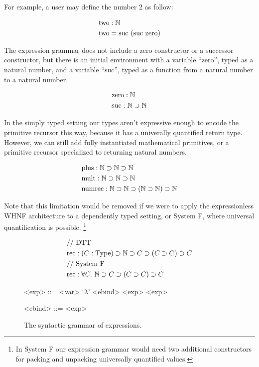 \documentclass[preprint,authoryear]{sigplanconf}
\def\asc{:}
\def\arr{\supset}
\def\nat{\mathbb{N}}
\def\zero{\con{zero}}
\newcommand{\suc}[1]{\con{suc}~#1}
\newcommand{\con}[1]{\textmd{#1}}
\begin{document}
For example, a user may define the number 2 as follow:

\begin{align*}
&\con{two} : \nat\\
&\con{two} = \suc{(\suc{\zero})}
\end{align*}

The expression grammar does not include a zero constructor or a
successor constructor, but there is an initial environment with a
variable ``zero'', typed as a natural number, and a variable ``suc'',
typed as a function from a natural number to a natural number.

\begin{align*}
&\con{zero} : \nat\\
&\con{suc} : \nat \arr \nat
\end{align*}

In the simply typed setting our types aren't expressive enough to
encode the primitive recursor this way, because it has a univerally
quantified return type. However, we can still add fully instantiated
mathematical primitives, or a primitive recursor specialized to
returning natural numbers.

\begin{align*}
&\con{plus} : \nat \arr \nat \arr \nat\\
&\con{mult} : \nat \arr \nat \arr \nat\\
&\con{numrec} : \nat \arr \nat \arr (\nat \arr \nat) \arr \nat
\end{align*}

Note that this limitation would be removed if we were to apply the
expressionless WHNF architecture to a dependently typed setting, or
System F, where universal quantification is possible.
\footnote{In System F our expression grammar would need two
  additional constructors for packing and unpacking universally
  quantified values.}

\begin{align*}
&//~ \con{DTT}\\
&\con{rec} : (C \asc \con{Type}) \arr \nat \arr C \arr (C \arr C) \arr C\\
&//~ \con{System F}\\
&\con{rec} : \forall C.~ \nat \arr C \arr (C \arr C) \arr C
\end{align*}


\begin{figure}[t!]
\caption{
The syntactic grammar of expressions.
}
\begin{grammar}
<exp> ::= <var> 
\alt `\(\lambda\)' <ebind>
\alt <exp> <exp>

<ebind> ::= <exp> 
\end{grammar}
\label{fig:gram:exp}
\end{figure}
\end{document}
